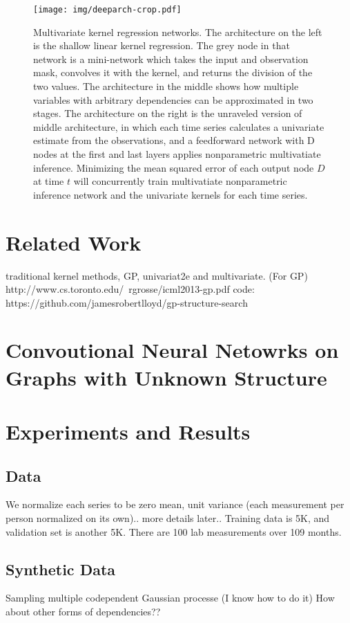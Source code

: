 \documentclass{article} %
\begin{document}
\begin{figure}[h]
\begin{center}
\texttt{[image: img/deeparch-crop.pdf]}
\end{center}
\caption{Multivariate kernel regression networks. The architecture on the left is the shallow linear kernel regression. The grey node in that network is a mini-network which takes the input and observation mask, convolves it with the kernel, and returns the division of the two values. The architecture in the middle shows how multiple variables with arbitrary dependencies can be approximated in two stages. The architecture on the right is the unraveled version of middle architecture, in which each time series calculates a univariate estimate from the observations, and a feedforward network with D nodes at the first and last layers applies nonparametric multivatiate inference. Minimizing the mean squared error of each output node $D$ at time $t$ will concurrently train multivatiate nonparametric inference network and the univariate kernels for each time series.}\label{fig:deepkr}
\end{figure}

\section{Related Work}
traditional kernel methods, GP, univariat2e and multivariate.
(For GP)
http://www.cs.toronto.edu/~rgrosse/icml2013-gp.pdf
code: https://github.com/jamesrobertlloyd/gp-structure-search

\section{Convoutional Neural Netowrks on Graphs with Unknown Structure}

\section{Experiments and Results}
\subsection{Data}
We normalize each series to be zero mean, unit variance (each measurement per person normalized on its own).. more details later..
Training data is 5K, and validation set is another 5K. There are 100 lab measurements over 109 months. 

\subsection{Synthetic Data}
Sampling multiple codependent Gaussian processe (I know how to do it)
How about other forms of dependencies??
\end{document}
